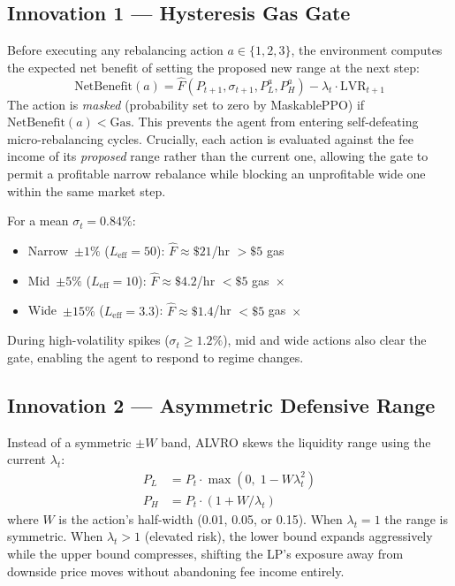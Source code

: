 \documentclass{article}
\begin{document}
\subsection{Innovation 1 — Hysteresis Gas Gate}

Before executing any rebalancing action $a \in \{1, 2, 3\}$, the environment
computes the expected net benefit of setting the proposed new range at the
next step:
\begin{equation}
  \text{NetBenefit}(a) = \hat{F}(P_{t+1}, \sigma_{t+1}, P_L^a, P_H^a)
                         - \lambda_t \cdot \text{LVR}_{t+1}
  \label{eq:gate}
\end{equation}
The action is \emph{masked} (probability set to zero by MaskablePPO) if
$\text{NetBenefit}(a) < \text{Gas}$.  This prevents the agent from entering
self-defeating micro-rebalancing cycles.  Crucially, each action is evaluated
against the fee income of its \emph{proposed} range rather than the current
one, allowing the gate to permit a profitable narrow rebalance while blocking
an unprofitable wide one within the same market step.

For a mean $\sigma_t = 0.84\%$:
\begin{itemize}
  \item Narrow~$\pm1\%$ ($L_{\text{eff}}=50$): $\hat{F} \approx \$21$/hr $> \$5$ gas~\checkmark
  \item Mid~$\pm5\%$ ($L_{\text{eff}}=10$): $\hat{F} \approx \$4.2$/hr $< \$5$ gas~$\times$
  \item Wide~$\pm15\%$ ($L_{\text{eff}}=3.3$): $\hat{F} \approx \$1.4$/hr $< \$5$ gas~$\times$
\end{itemize}
During high-volatility spikes ($\sigma_t \geq 1.2\%$), mid and wide actions
also clear the gate, enabling the agent to respond to regime changes.

\subsection{Innovation 2 — Asymmetric Defensive Range}

Instead of a symmetric $\pm W$ band, ALVRO skews the liquidity range using
the current $\lambda_t$:
\begin{align}
  P_L &= P_t \cdot \max\!\left(0,\; 1 - W\lambda_t^2\right)
  \label{eq:lower} \\
  P_H &= P_t \cdot \left(1 + W/\lambda_t\right)
  \label{eq:upper}
\end{align}
where $W$ is the action's half-width (0.01, 0.05, or 0.15).  When
$\lambda_t = 1$ the range is symmetric.  When $\lambda_t > 1$ (elevated risk),
the lower bound expands aggressively while the upper bound compresses,
shifting the LP's exposure away from downside price moves without
abandoning fee income entirely.
\end{document}
